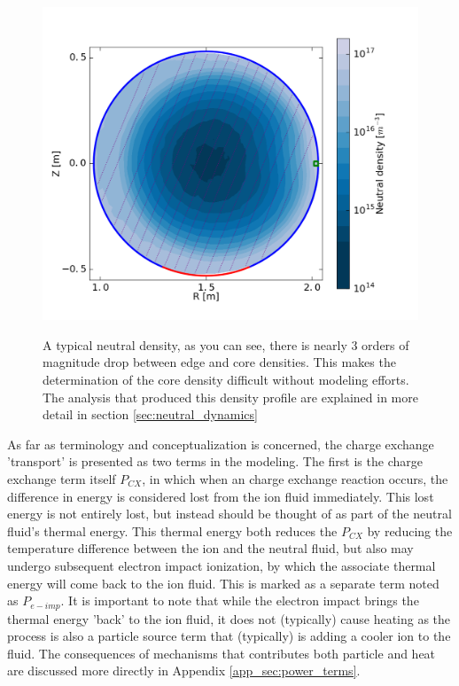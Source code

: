 \begin{refsection}
\begin{figure}[!htb]
	\centering
	\includegraphics[width = 0.75\linewidth]{./transport_modeling/neutral_n.png}
    \label{fig:n_n_0}
    \caption[Typical neutral density profile]{A typical neutral density, as you can see, there is nearly 3 orders of magnitude drop between edge and core densities. This makes the determination of the core density difficult without modeling efforts. The analysis that produced this density profile are explained in more detail in section \ref{sec:neutral_dynamics}}
\end{figure}%

As far as terminology and conceptualization is concerned, the charge exchange 'transport' is presented as two terms in the modeling. The first is the charge exchange term itself $P_{CX}$, in which when an charge exchange reaction occurs, the difference in energy is considered lost from the ion fluid immediately. This lost energy is not entirely lost, but instead should be thought of as part of the neutral fluid's thermal energy. This thermal energy both reduces the $P_{CX}$ by reducing the temperature difference between the ion and the neutral fluid, but also may undergo subsequent electron impact ionization, by which the associate thermal energy will come back to the ion fluid. This is marked as a separate term noted as $P_{e-imp}$. It is important to note that while the electron impact brings the thermal energy 'back' to the ion fluid, it does not (typically) cause heating as the process is also a particle source term that (typically) is adding a cooler ion to the fluid. The consequences of mechanisms that contributes both particle and heat are discussed more directly in Appendix \ref{app_sec:power_terms}.


\end{refsection}
